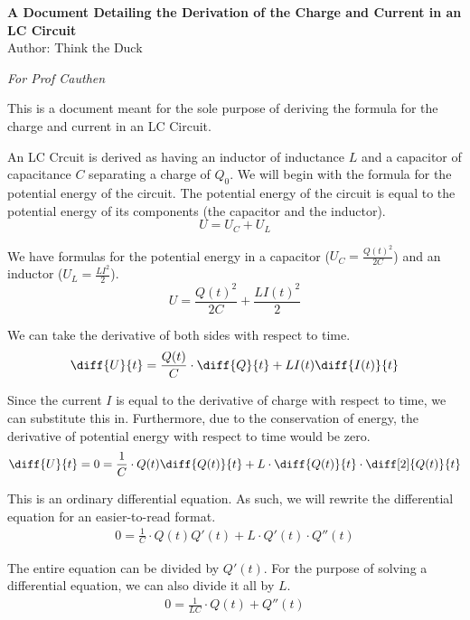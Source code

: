 \documentclass[12pt]{article}
\begin{document}
    \begin{center}
        \textbf{A Document Detailing the Derivation of the Charge and Current in an LC Circuit}\\
        Author: Think the Duck
    \end{center}
    \textit{For Prof Cauthen}

    This is a document meant for the sole purpose of deriving the formula for the charge and current in an LC Circuit.

    An LC Crcuit is derived as having an inductor of inductance $L$ and a capacitor of capacitance $C$ separating a charge of $Q_0$. 
    We will begin with the formula for the potential energy of the circuit.
    The potential energy of the circuit is equal to the potential energy of its components (the capacitor and the inductor).
    \begin{equation}
        U = U_C + U_L
    \end{equation}
    
    We have formulas for the potential energy in a capacitor ($U_C = \frac{Q(t)^2}{2C}$) and an inductor ($U_L = \frac{LI^2}{2}$).
    \begin{equation}
        U = \frac{Q(t)^2}{2C} + \frac{LI(t)^2}{2}
    \end{equation}

    We can take the derivative of both sides with respect to time. 
    \begin{gather}
        \diff{U}{t} = \frac{Q(t)}{C} \cdot \diff{Q}{t} + LI(t)\diff{I(t)}{t}
    \end{gather}

    Since the current $I$ is equal to the derivative of charge with respect to time, we can substitute this in.
    Furthermore, due to the conservation of energy, the derivative of potential energy with respect to time would be zero.
    \begin{gather}
        \diff{U}{t} = 0 = \frac{1}{C} \cdot Q(t) \diff{Q(t)}{t} + L \cdot \diff{Q(t)}{t} \cdot \diff[2]{Q(t)}{t}
    \end{gather}

    This is an ordinary differential equation.
    As such, we will rewrite the differential equation for an easier-to-read format.
    \begin{gather}
        0 = \frac{1}{C} \cdot Q(t) Q'(t) + L \cdot Q'(t) \cdot Q''(t)
    \end{gather}

    The entire equation can be divided by $Q'(t)$.
    For the purpose of solving a differential equation, we can also divide it all by $L$.
    \begin{gather}
        0 = \frac{1}{LC} \cdot Q(t) + Q''(t)
    \end{gather}
\end{document}

